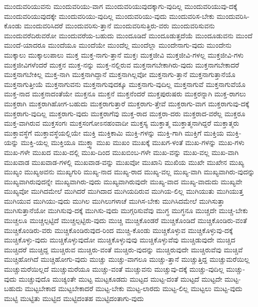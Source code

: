 {ಮುಂದುವರಿಯುವನು
ಮುಂದುವರಿಯು-ವಾಗ
ಮುಂದುವರಿಯುವುದಕ್ಕಾಗು-ವುದಿಲ್ಲ
ಮುಂದುವರಿಯುವು-ದಕ್ಕೆ
ಮುಂದುವರಿಯುವುದಕ್ಕೇ
ಮುಂದುವರಿಯು-ವುದಿಲ್ಲ
ಮುಂದುವರಿಯು-ವುದು
ಮುಂದುವರಿಸ-ಬೇಕು
ಮುಂದುವರಿಸಿ-ಕೊಂಡು
ಮುಂದುವರಿಸಿದರೆ
ಮುಂದುವರಿಸು-ತ್ತಾನೆ
ಮುಂದುವರಿಸುತ್ತಿರು-ವರು
ಮುಂದುವರಿಸುವನು
ಮುಂದುವರೆದಿರುವರೋ
ಮುಂದುವರೆಯ-ಬಹುದು
ಮುಂದೂಡಿದೆ
ಮುಂದೂಡುತ್ತದೆಯೆ
ಮುಂದೂಡುವನು
ಮುಂದೆ
ಮುಂದೆ-ಯಾದರೂ
ಮುಂದೆಯೂ
ಮುಂದೆಯೇ
ಮುಂದೆಲ್ಲ
ಮುಂದೆಲ್ಲಾ
ಮುಂದೇನಾಗು-ವುದು
ಮುಂದೇನು
ಮುಕ್ಕಾಲು
ಮುಕ್ಕಾಲುಪಾಲು
ಮುಕ್ತ
ಮುಕ್ತ-ನಾಗು-ತ್ತಾನೆ
ಮುಕ್ತಃ
ಮುಕ್ತಜೀವಿ
ಮುಕ್ತಜೀವಿ-ಗಳಲ್ಲ
ಮುಕ್ತಜೀವಿ-ಗಳು
ಮುಕ್ತಜೀವಿಗಳೆಂದರೆ
ಮುಕ್ತನ
ಮುಕ್ತ-ನನ್ನು
ಮುಕ್ತ-ನಲ್ಲಿರುವ
ಮುಕ್ತನಾಗಬೇಕಾಗಿರು-ವುದು
ಮುಕ್ತನಾಗಬೇಕಾದರೆ
ಮುಕ್ತನಾಗಬೇಕಿಲ್ಲ
ಮುಕ್ತ-ನಾಗಿ
ಮುಕ್ತನಾಗಿದ್ದಾನೆ
ಮುಕ್ತನಾಗಿಲ್ಲವೋ
ಮುಕ್ತನಾಗು-ತ್ತಾನೆ
ಮುಕ್ತನಾಗುತ್ತಾನೆಯೊ
ಮುಕ್ತನಾಗುತ್ತೀಯೆ
ಮುಕ್ತನಾಗುವನು
ಮುಕ್ತನಾಗುವುದಕ್ಕೂ
ಮುಕ್ತನಾಗು-ವುದಿಲ್ಲ
ಮುಕ್ತನಾಗುವೆ
ಮುಕ್ತನಾಗುವೆಯೊ
ಮುಕ್ತ-ನಾದ
ಮುಕ್ತನಾದಂತೆಯೇ
ಮುಕ್ತನೂ
ಮುಕ್ತನೆ
ಮುಕ್ತನೆಂದರೆ
ಮುಕ್ತಪುರುಷರು
ಮುಕ್ತರನ್ನಾಗಿ
ಮುಕ್ತ-ರಾಗಲು
ಮುಕ್ತರಾಗಿ
ಮುಕ್ತರಾಗಿಹೋಗ-ಬಹುದು
ಮುಕ್ತರಾಗುತ್ತಾರೆ
ಮುಕ್ತರಾಗು-ತ್ತೇವೆ
ಮುಕ್ತರಾಗು-ವಾಗ
ಮುಕ್ತರಾಗುವು-ದಕ್ಕೆ
ಮುಕ್ತರಾಗು-ವುದಿಲ್ಲ
ಮುಕ್ತರಾಗು-ವುದು
ಮುಕ್ತರಾಗೆವು
ಮುಕ್ತ-ರಾದ
ಮುಕ್ತರಾ-ದರು
ಮುಕ್ತರಾದ-ವರೆಲ್ಲ
ಮುಕ್ತರೂ
ಮುಕ್ತ-ವಾಗಿರುವ
ಮುಕ್ತಸಂಗಃ
ಮುಕ್ತಸಂಗೋಽನಹಂವಾದೀ
ಮುಕ್ತಸ್ಯ
ಮುಕ್ತಾತ್ಮ
ಮುಕ್ತಾತ್ಮನಾಗಿದ್ದರೆ
ಮುಕ್ತಾತ್ಮರು
ಮುಕ್ತಾವಸ್ಥೆಗೆ
ಮುಕ್ತಾವಸ್ಥೆಯಲ್ಲಿಯೇ
ಮುಕ್ತಿ
ಮುಕ್ತಿಕಾಮಿ
ಮುಕ್ತಿ-ಗಳನ್ನು
ಮುಕ್ತಿ-ಗಾಗಿ
ಮುಕ್ತಿಗೆ
ಮುಕ್ತಿಯ
ಮುಕ್ತಿ-ಯನ್ನು
ಮುಕ್ತಿ-ಯಲ್ಲ
ಮುಕ್ತಿಯೂ
ಮುಕ್ತ್ವಾ
ಮುಖ
ಮುಖಂ
ಮುಖಕ್ಕೆ
ಮುಖಗ-ಳಂತೆ
ಮುಖ-ಗಳನ್ನು
ಮುಖ-ಗಳು
ಮುಖ-ಗಳೇ
ಮುಖದ
ಮುಖ-ದಲ್ಲಿ
ಮುಖ-ದಿಂದ
ಮುಖಬಿಂಬ-ಗಳೇ
ಮುಖ-ವನ್ನು
ಮುಖ-ವಲ್ಲ
ಮುಖ-ವಾಗಿ
ಮುಖವಾಡ
ಮುಖವಾಡ-ಗಳಲ್ಲಿ
ಮುಖವಾಡ-ವನ್ನು
ಮುಖವೋ
ಮುಖಾನಿ
ಮುಖಿಯ
ಮುಖೇ
ಮುಖೇನ
ಮುಖ್ಯ
ಮುಖ್ಯಂ
ಮುಖ್ಯಅವನು
ಮುಖ್ಯಗುರಿ
ಮುಖ್ಯ-ನಾದ
ಮುಖ್ಯ-ರಾದ
ಮುಖ್ಯ-ವಲ್ಲ
ಮುಖ್ಯ-ವಾಗಿ
ಮುಖ್ಯವಾಗಿರು-ವುದನ್ನು
ಮುಖ್ಯವಾಗಿರುವುದನ್ನೇ
ಮುಖ್ಯವಾಗಿರು-ವುದು
ಮುಖ್ಯವಾಗಿರುವುದೇ
ಮುಖ್ಯ-ವಾದ
ಮುಖ್ಯ-ವಾದುದು
ಮುಖ್ಯವೇ
ಮುಖ್ಯವೋ
ಮುಗಿದಮೇಲೆ
ಮುಗಿದರೆ
ಮುಗಿದಾದ
ಮುಗಿಯದಿರುವ
ಮುಗಿಯ-ಲಿಲ್ಲ
ಮುಗಿಯುತು
ಮುಗಿಯುತ್ತ
ಮುಗಿಯುವ
ಮುಗಿಯು-ವುದು
ಮುಗಿಲ
ಮುಗಿಲುಗಳಾಚೆ
ಮುಗಿಸ-ಬೇಕು
ಮುಗಿಸಿದಮೇಲೆ
ಮುಗಿಸುತ್ತಾ
ಮುಗಿಸುತ್ತಾನೆಯೋ
ಮುಗಿಸುವು-ದಕ್ಕೆ
ಮುಗಿಸು-ವುದು
ಮುಗ್ಗರಿಸುವೆವು
ಮುಗ್ಧ
ಮುಗ್ಧನೂ
ಮುಚ್ಚದೇ
ಮುಚ್ಚ-ಬೇಕು
ಮುಚ್ಚಲೂ
ಮುಚ್ಚಲ್ಪಟ್ಟಿದೆ
ಮುಚ್ಚಲ್ಪಟ್ಟಿರು-ವುದು
ಮುಚ್ಚಿ
ಮುಚ್ಚಿಕೊಂಡರೆ
ಮುಚ್ಚಿಕೊಂಡಿದೆ
ಮುಚ್ಚಿಕೊಂಡಿರು-ವಂತೆ
ಮುಚ್ಚಿಕೊಂಡಿರು-ವರು
ಮುಚ್ಚಿಕೊಂಡಿರುವುದ-ರಿಂದ
ಮುಚ್ಚಿ-ಕೊಂಡು
ಮುಚ್ಚಿಕೊಳ್ಳುವ
ಮುಚ್ಚಿಕೊಳ್ಳುವು-ದಕ್ಕೆ
ಮುಚ್ಚಿಕೊಳ್ಳು-ವುದು
ಮುಚ್ಚಿಕೊಳ್ಳುವುದೋ
ಮುಚ್ಚಿಕೊಳ್ಳುವುವು
ಮುಚ್ಚಿಕೊಳ್ಳುವೆವು
ಮುಚ್ಚಿಡುವುದೇ
ಮುಚ್ಚಿದ
ಮುಚ್ಚಿದರೆ
ಮುಚ್ಚಿದ್ದ
ಮುಚ್ಚಿರುವ
ಮುಚ್ಚಿರು-ವಂತೆ
ಮುಚ್ಚಿರು-ವುದನ್ನು
ಮುಚ್ಚಿರುವುದೇ
ಮುಚ್ಚಿರುವೆವು
ಮುಚ್ಚಿವೆ
ಮುಚ್ಚಿಹೋಗಿದೆ
ಮುಚ್ಚಿಹೋಗು-ವುದು
ಮುಚ್ಚು
ಮುಚ್ಚು-ವಾಗಲೂ
ಮುಚ್ಚು-ತ್ತಾನೆ
ಮುಚ್ಚುತ್ತಿದ್ದ
ಮುಚ್ಚುಮರೆಯಿಲ್ಲ
ಮುಚ್ಚುಮರೆಯಿಲ್ಲದೆ
ಮುಚ್ಚುಮರೆಯೂ
ಮುಚ್ಚು-ವಂತೆ
ಮುಚ್ಚುವನು
ಮುಚ್ಚುವು-ದಕ್ಕೆ
ಮುಚ್ಚು-ವುದಿಲ್ಲ
ಮುಚ್ಚು-ವುದು
ಮುಚ್ಚುವುದೊ
ಮುಚ್ಯಂತೇ
ಮುಟ್ಟ
ಮುಟ್ಟಕೂಡದು
ಮುಟ್ಟದ
ಮುಟ್ಟ-ದಂತೆ
ಮುಟ್ಟದೆ
ಮುಟ್ಟದೇ
ಮುಟ್ಟ-ಬಹುದು
ಮುಟ್ಟಬೇಕಾದ
ಮುಟ್ಟಬೇಕಾದರೆ
ಮುಟ್ಟ-ಬೇಕು
ಮುಟ್ಟ-ಲಾರದು
ಮುಟ್ಟ-ಲಿಲ್ಲ
ಮುಟ್ಟಲು
ಮುಟ್ಟ-ವುದು
ಮುಟ್ಟಿ
ಮುಟ್ಟಿತು
ಮುಟ್ಟಿದ
ಮುಟ್ಟಿದಂತಹ
ಮುಟ್ಟಿದಂತಾಗು-ವುದು
}
